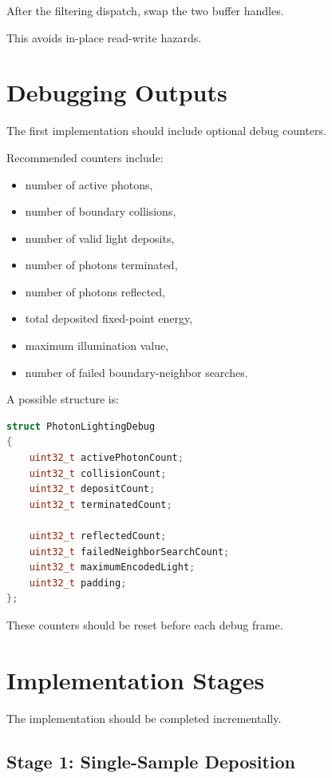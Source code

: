 \documentclass[11pt]{article}
\begin{document}
After the filtering dispatch, swap the two buffer handles.

This avoids in-place read-write hazards.

\section{Debugging Outputs}

The first implementation should include optional debug counters.

Recommended counters include:

\begin{itemize}
    \item number of active photons,
    \item number of boundary collisions,
    \item number of valid light deposits,
    \item number of photons terminated,
    \item number of photons reflected,
    \item total deposited fixed-point energy,
    \item maximum illumination value,
    \item number of failed boundary-neighbor searches.
\end{itemize}

A possible structure is:

\begin{lstlisting}[language=C++]
struct PhotonLightingDebug
{
    uint32_t activePhotonCount;
    uint32_t collisionCount;
    uint32_t depositCount;
    uint32_t terminatedCount;

    uint32_t reflectedCount;
    uint32_t failedNeighborSearchCount;
    uint32_t maximumEncodedLight;
    uint32_t padding;
};
\end{lstlisting}

These counters should be reset before each debug frame.

\section{Implementation Stages}

The implementation should be completed incrementally.

\subsection{Stage 1: Single-Sample Deposition}
\end{document}
